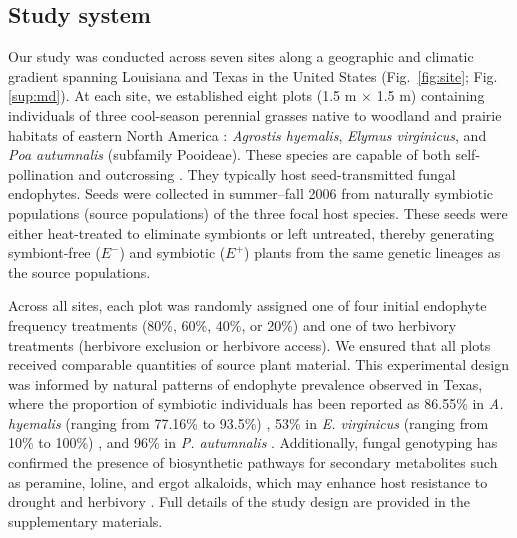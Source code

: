 \documentclass[12pt]{article}\usepackage[]{graphicx}\usepackage[dvipsnames]{xcolor}
\begin{document}
\subsection*{Study system}
Our study was conducted across seven sites along a geographic and climatic gradient spanning Louisiana and Texas in the United States (Fig.~\ref{fig:site}; Fig.\ref{sup:md}).  
At each site, we established eight plots (1.5 m $\times$ 1.5 m) containing individuals of three cool-season perennial grasses native to woodland and prairie habitats of eastern North America \citep{shaw2011guide}: \emph{Agrostis hyemalis}, \emph{Elymus virginicus}, and \emph{Poa autumnalis} (subfamily Pooideae).  
These species are capable of both self-pollination and outcrossing \citep{church1958artificial}.  
They typically host seed-transmitted fungal endophytes.
Seeds were collected in summer–fall 2006 from naturally symbiotic populations (source populations) of the three focal host species. These seeds were either heat-treated to eliminate symbionts or left untreated, thereby generating symbiont-free ($E^-$) and symbiotic ($E^+$) plants from the same genetic lineages as the source populations.

Across all sites, each plot was randomly assigned one of four initial endophyte frequency treatments (80\%, 60\%, 40\%, or 20\%) and one of two herbivory treatments (herbivore exclusion or herbivore access).  
We ensured that all plots received comparable quantities of source plant material.
This experimental design was informed by natural patterns of endophyte prevalence observed in Texas, where the proportion of symbiotic individuals has been reported as 86.55\% in \emph{A. hyemalis} (ranging from 77.16\% to 93.5\%) \citep{donald2021context}, 53\% in \emph{E. virginicus} (ranging from 10\% to 100\%) \citep{sneck2017variation}, and 96\% in \emph{P. autumnalis} \citep{rudgers2009fungus}.  
Additionally, fungal genotyping has confirmed the presence of biosynthetic pathways for secondary metabolites such as peramine, loline, and ergot alkaloids, which may enhance host resistance to drought and herbivory \citep{beaudry1951seed}.
Full details of the study design are provided in the supplementary materials.
\end{document}
